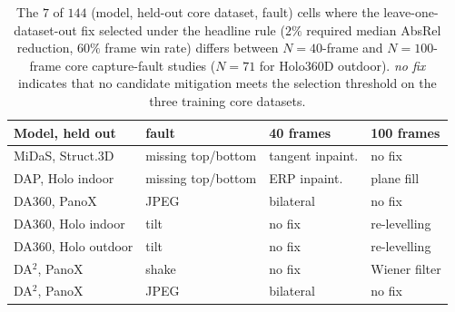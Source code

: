 \documentclass{article}
\newcommand{\absrel}{AbsRel}
\begin{document}
\begin{table}[!htbp]\centering\small
\caption{The $7$ of $144$ (model, held-out core dataset, fault) cells where the leave-one-dataset-out fix selected under the headline rule ($2\%$ required median \absrel{} reduction, $60\%$ frame win rate) differs between $N=40$-frame and $N=100$-frame core capture-fault studies ($N=71$ for Holo360D outdoor). \emph{no fix} indicates that no candidate mitigation meets the selection threshold on the three training core datasets.}\label{tab:stabilitydiff}
\begin{tabular}{llll}\toprule
Model, held out & fault & 40 frames & 100 frames\\\midrule
MiDaS, Struct.3D & missing top/bottom & tangent inpaint. & no fix\\
DAP, Holo indoor & missing top/bottom & ERP inpaint. & plane fill\\
DA360, PanoX & JPEG & bilateral & no fix\\
DA360, Holo indoor & tilt & no fix & re-levelling\\
DA360, Holo outdoor & tilt & no fix & re-levelling\\
DA$^2$, PanoX & shake & no fix & Wiener filter\\
DA$^2$, PanoX & JPEG & bilateral & no fix\\
\bottomrule\end{tabular}
\end{table}
\end{document}
